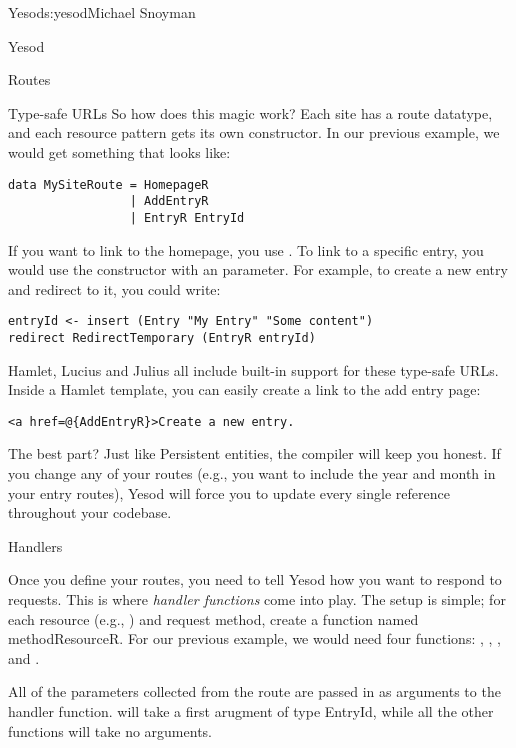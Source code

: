 \begin{aosachapter}{Yesod}{s:yesod}{Michael Snoyman}
\begin{aosasect1}{Yesod}
\begin{aosasect2}{Routes}
\begin{aosasect3}{Type-safe URLs}
So how does this magic work? Each site has a route datatype, and each
resource pattern gets its own constructor. In our previous example, we
would get something that looks like:

\begin{verbatim}
data MySiteRoute = HomepageR
                 | AddEntryR
                 | EntryR EntryId

\end{verbatim}

If you want to link to the homepage, you use . To link
to a specific entry, you would use the  constructor with
an  parameter. For example, to create a new entry and
redirect to it, you could write:

\begin{verbatim}
entryId <- insert (Entry "My Entry" "Some content")
redirect RedirectTemporary (EntryR entryId)

\end{verbatim}

Hamlet, Lucius and Julius all include built-in support for these
type-safe URLs. Inside a Hamlet template, you can easily create a link
to the add entry page:

\begin{verbatim}
<a href=@{AddEntryR}>Create a new entry.
\end{verbatim}

The best part? Just like Persistent entities, the compiler will keep
you honest. If you change any of your routes (e.g., you want to
include the year and month in your entry routes), Yesod will force you
to update every single reference throughout your codebase.

\end{aosasect3}

\end{aosasect2}

\begin{aosasect2}{Handlers}

Once you define your routes, you need to tell Yesod how you want to
respond to requests. This is where \emph{handler functions} come into
play. The setup is simple; for each resource (e.g., )
and request method, create a function named methodResourceR. For our
previous example, we would need four functions: ,
, , and .

All of the parameters collected from the route are passed in as
arguments to the handler function.  will take a first
arugment of type EntryId, while all the other functions will take no
arguments.


\end{aosasect2}
\end{aosasect1}
\end{aosachapter}
